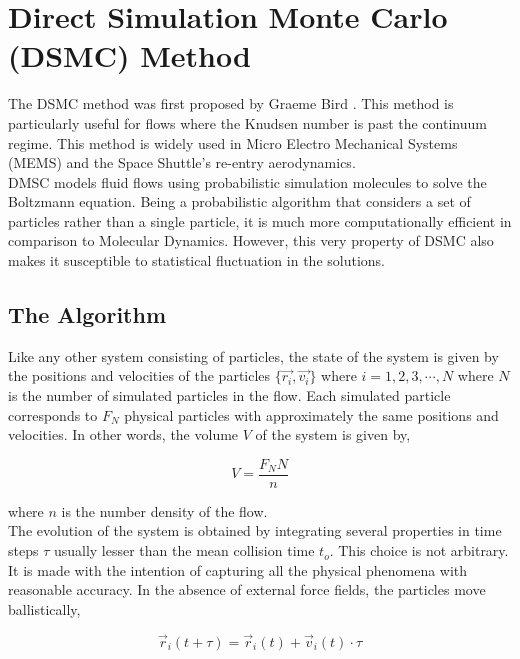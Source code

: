 \newpage
\chapter{Direct Simulation Monte Carlo (DSMC) Method}

The DSMC method was first proposed by Graeme Bird \cite{bird1994molecular}. This method is particularly useful for flows where the Knudsen number is past the continuum regime. This method is widely used in Micro Electro Mechanical Systems (MEMS) and the Space Shuttle's re-entry aerodynamics. \\

\no DMSC models fluid flows using probabilistic simulation molecules to solve the Boltzmann equation. Being a probabilistic algorithm that considers a set of particles rather than a single particle, it is much more computationally efficient in comparison to Molecular Dynamics. However, this very property of DSMC also makes it susceptible to statistical fluctuation in the solutions.

\section{The Algorithm}

Like any other system consisting of particles, the state of the system is given by the positions and velocities of the particles $\{ \vec{r_i}, \vec{v_i} \}$ where $i = 1, 2, 3, \cdots, N$ where $N$ is the number of simulated particles in the flow. Each simulated particle corresponds to $F_N$ physical particles with approximately the same positions and velocities. In other words, the volume $V$ of the system is given by,

\begin{equation}
	V = \frac{F_N N}{n}
\end{equation}

\no where $n$ is the number density of the flow. \\

\no The evolution of the system is obtained by integrating several properties in time steps $\tau$ usually lesser than the mean collision time $t_o$. This choice is not arbitrary. It is made with the intention of capturing all the physical phenomena with reasonable accuracy. In the absence of external force fields, the particles move ballistically,

\begin{equation}
	\vec{r}_i(t + \tau) = \vec{r}_i(t) + \vec{v}_i(t) \cdot \tau
\end{equation}

